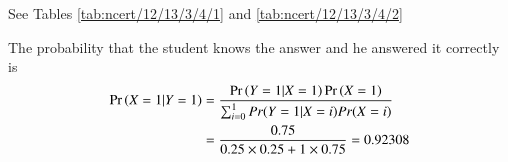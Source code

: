 See  Tables
\ref{tab:ncert/12/13/3/4/1}
and 
	\ref{tab:ncert/12/13/3/4/2}
%
\begin{table}[H]
	\centering

\caption{}
\label{tab:ncert/12/13/3/4/1}
\end{table}

\begin{table}[H]
	\centering
	
	\caption{}
	\label{tab:ncert/12/13/3/4/2}
\end{table}
%
The probability that the student knows the answer and he answered it correctly is 
%
\begin{align}
	\Pr\left(X=1|Y=1\right) &=\frac{\Pr\left(Y=1|X=1\right)\Pr\left(X=1\right)}{\sum_{i=0}^{1}Pr(Y=1|X=i)Pr(X=i)}\\
	&=\frac{0.75}{{0.25\times0.25}+{1\times0.75}}
	=0.92308
	\end{align}
